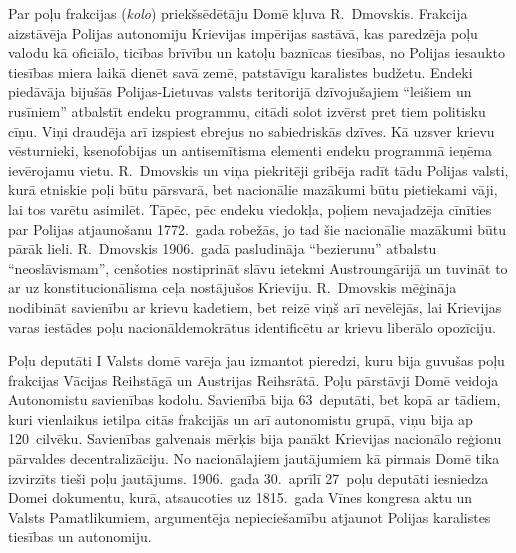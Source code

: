 \documentclass[twoside,a5paper,12pt,fleqn,openany]{extbook}
\newcommand{\pltxti}[1]{\textit{\textpolish{#1}}}
\begin{document}
Par poļu frakcijas (\pltxti{kolo}) priekšsēdētāju Domē kļuva R.~Dmovskis. Frakcija aizstāvēja Polijas autonomiju Krievijas impērijas sastāvā, kas paredzēja poļu valodu kā oficiālo, ticības brīvību un katoļu baznīcas tiesības, no Polijas iesaukto tiesības miera laikā dienēt savā zemē, patstāvīgu karalistes budžetu. Endeki piedāvāja bijušās Polijas-Lietuvas valsts teritorijā dzīvojušajiem ``leišiem un rusīniem'' atbalstīt endeku programmu, citādi solot izvērst pret tiem politisku cīņu. Viņi draudēja arī izspiest ebrejus no sabiedriskās dzīves. Kā uzsver krievu vēsturnieki, ksenofobijas un antisemītisma elementi endeku programmā ieņēma ievērojamu vietu. R.~Dmovskis un viņa piekritēji gribēja radīt tādu Polijas valsti, kurā etniskie poļi būtu pārsvarā, bet nacionālie mazākumi būtu pietiekami vāji, lai tos varētu asimilēt. Tāpēc, pēc endeku viedokļa, poļiem nevajadzēja cīnīties par Polijas atjaunošanu 1772.~gada robežās, jo tad šie nacionālie mazākumi būtu pārāk lieli. R.~Dmovskis 1906.~gadā pasludināja ``bezierunu'' atbalstu ``neoslāvismam'', cenšoties nostiprināt slāvu ietekmi Austroungārijā un tuvināt to ar uz konstitucionālisma ceļa nostājušos Krieviju. R.~Dmovskis mēģināja nodibināt savienību ar krievu kadetiem, bet reizē viņš arī nevēlējās, lai Krievijas varas iestādes poļu nacionāldemokrātus identificētu ar krievu liberālo opozīciju.

Poļu deputāti I Valsts domē varēja jau izmantot pieredzi, kuru bija guvušas poļu frakcijas Vācijas Reihstāgā un Austrijas Reihsrātā. Poļu pārstāvji Domē veidoja Autonomistu savienības kodolu. Savienībā bija 63~deputāti, bet kopā ar tādiem, kuri vienlaikus ietilpa citās frakcijās un arī autonomistu grupā, viņu bija ap 120~cilvēku. Savienības galvenais mērķis bija panākt Krievijas nacionālo reģionu pārvaldes decentralizāciju. No nacionālajiem jautājumiem kā pirmais Domē tika izvirzīts tieši poļu jautājums. 1906.~gada 30.~aprīlī 27~poļu deputāti iesniedza Domei dokumentu, kurā, atsaucoties uz 1815.~gada Vīnes kongresa aktu un Valsts Pamatlikumiem, argumentēja nepieciešamību atjaunot Polijas karalistes tiesības un autonomiju.
\end{document}
